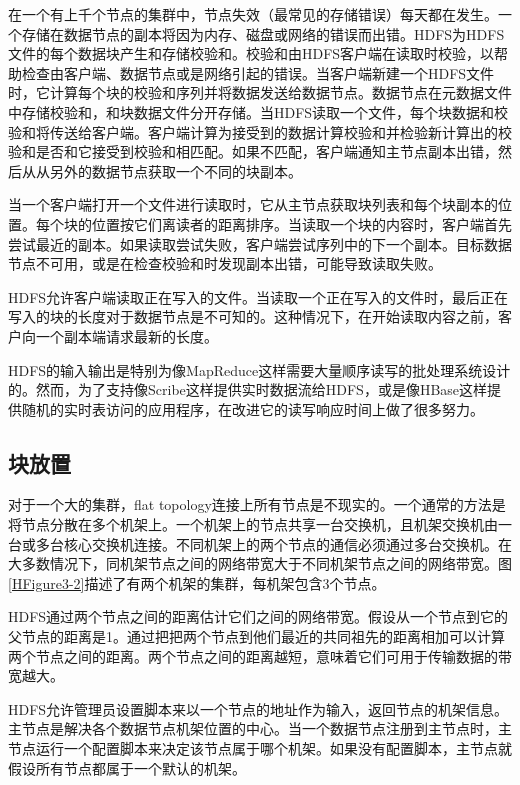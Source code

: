在一个有上千个节点的集群中，节点失效（最常见的存储错误）每天都在发生。一个存储在数据节点的副本将因为内存、磁盘或网络的错误而出错。HDFS为HDFS文件的每个数据块产生和存储校验和。校验和由HDFS客户端在读取时校验，以帮助检查由客户端、数据节点或是网络引起的错误。当客户端新建一个HDFS文件时，它计算每个块的校验和序列并将数据发送给数据节点。数据节点在元数据文件中存储校验和，和块数据文件分开存储。当HDFS读取一个文件，每个块数据和校验和将传送给客户端。客户端计算为接受到的数据计算校验和并检验新计算出的校验和是否和它接受到校验和相匹配。如果不匹配，客户端通知主节点副本出错，然后从从另外的数据节点获取一个不同的块副本。

当一个客户端打开一个文件进行读取时，它从主节点获取块列表和每个块副本的位置。每个块的位置按它们离读者的距离排序。当读取一个块的内容时，客户端首先尝试最近的副本。如果读取尝试失败，客户端尝试序列中的下一个副本。目标数据节点不可用，或是在检查校验和时发现副本出错，可能导致读取失败。

HDFS允许客户端读取正在写入的文件。当读取一个正在写入的文件时，最后正在写入的块的长度对于数据节点是不可知的。这种情况下，在开始读取内容之前，客户向一个副本端请求最新的长度。

HDFS的输入输出是特别为像MapReduce这样需要大量顺序读写的批处理系统设计的。然而，为了支持像Scribe这样提供实时数据流给HDFS，或是像HBase这样提供随机的实时表访问的应用程序，在改进它的读写响应时间上做了很多努力。

\subsection{块放置}

对于一个大的集群，flat topology连接上所有节点是不现实的。一个通常的方法是将节点分散在多个机架上。一个机架上的节点共享一台交换机，且机架交换机由一台或多台核心交换机连接。不同机架上的两个节点的通信必须通过多台交换机。在大多数情况下，同机架节点之间的网络带宽大于不同机架节点之间的网络带宽。图\ref{HFigure3-2}描述了有两个机架的集群，每机架包含3个节点。


HDFS通过两个节点之间的距离估计它们之间的网络带宽。假设从一个节点到它的父节点的距离是1。通过把把两个节点到他们最近的共同祖先的距离相加可以计算两个节点之间的距离。两个节点之间的距离越短，意味着它们可用于传输数据的带宽越大。

HDFS允许管理员设置脚本来以一个节点的地址作为输入，返回节点的机架信息。主节点是解决各个数据节点机架位置的中心。当一个数据节点注册到主节点时，主节点运行一个配置脚本来决定该节点属于哪个机架。如果没有配置脚本，主节点就假设所有节点都属于一个默认的机架。

